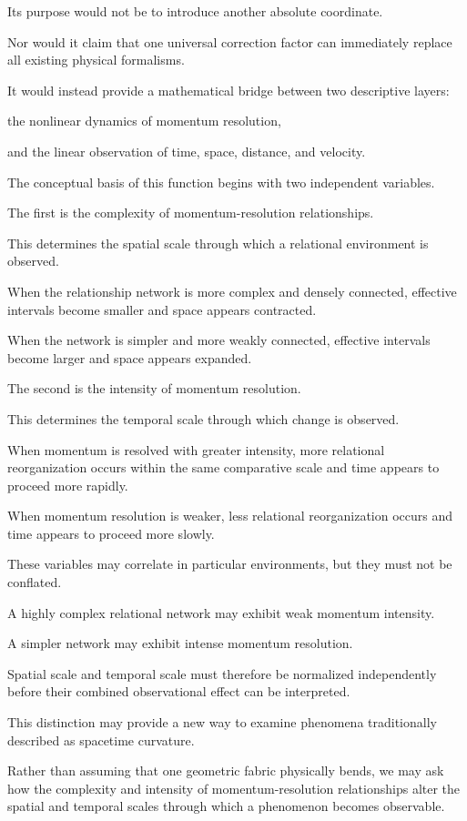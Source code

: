 Its purpose would not be to introduce another absolute coordinate.

Nor would it claim that one universal correction factor can immediately replace all existing physical formalisms.

It would instead provide a mathematical bridge between two descriptive layers:

the nonlinear dynamics of momentum resolution,

and the linear observation of time, space, distance, and velocity.

The conceptual basis of this function begins with two independent variables.

The first is the complexity of momentum-resolution relationships.

This determines the spatial scale through which a relational environment is observed.

When the relationship network is more complex and densely connected, effective intervals become smaller and space appears contracted.

When the network is simpler and more weakly connected, effective intervals become larger and space appears expanded.

The second is the intensity of momentum resolution.

This determines the temporal scale through which change is observed.

When momentum is resolved with greater intensity, more relational reorganization occurs within the same comparative scale and time appears to proceed more rapidly.

When momentum resolution is weaker, less relational reorganization occurs and time appears to proceed more slowly.

These variables may correlate in particular environments, but they must not be conflated.

A highly complex relational network may exhibit weak momentum intensity.

A simpler network may exhibit intense momentum resolution.

Spatial scale and temporal scale must therefore be normalized independently before their combined observational effect can be interpreted.

This distinction may provide a new way to examine phenomena traditionally described as spacetime curvature.

Rather than assuming that one geometric fabric physically bends, we may ask how the complexity and intensity of momentum-resolution relationships alter the spatial and temporal scales through which a phenomenon becomes observable.

